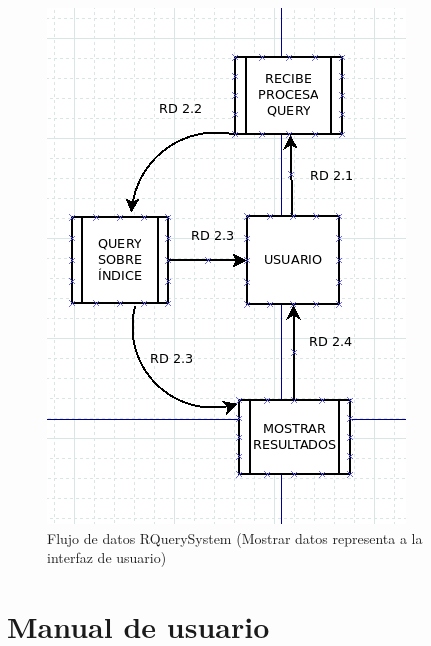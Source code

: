\begin{figure}[H] %
	\centering
	\includegraphics[scale=0.5]{r-fd.png}  %
	\caption{Flujo de datos RQuerySystem (Mostrar datos representa a la interfaz de usuario)} 
\end{figure}

\newpage
\section{Manual de usuario}

